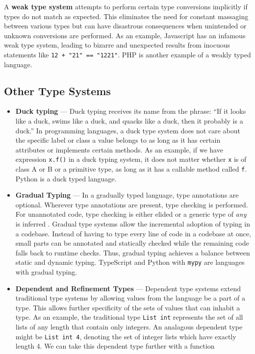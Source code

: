 \documentclass[12pt]{report}
\begin{document}
A \textbf{weak type system} attempts to perform certain type conversions implicitly if types do not match as expected. This eliminates the need for constant massaging between various types but can have disastrous consequences when unintended or unknown conversions are performed. As an example, Javascript has an infamous weak type system, leading to bizarre and unexpected results from inocuous statements like \texttt{12 + "21" == "1221"}. PHP is another example of a weakly typed language.

\subsection{Other Type Systems}
\begin{itemize}

\item \textbf{Duck typing} --- Duck typing receives its name from the phrase: ``If it looks like a duck, swims like a duck, and quacks like a duck, then it probably is a duck.'' In programming languages, a duck type system does not care about the specific label or class a value belongs to as long as it has certain attributes or implements certain methods. As an example, if we have expression \texttt{x.f()} in a duck typing system, it does not matter whether \texttt{x} is of class A or B or a primitive type, as long as it has a callable method called \texttt{f}. Python is a duck typed language.

\item \textbf{Gradual Typing} --- In a gradually typed language, type annotations are optional. Wherever type annotations are present, type checking is performed. For unannotated code, type checking is either elided or a generic type of \textit{any} is inferred \cite{PythonDropbox}. Gradual type systems allow the incremental adoption of typing in a codebase. Instead of having to type every line of code in a codebase at once, small parts can be annotated and statically checked while the remaining code falls back to runtime checks. Thus, gradual typing achieves a balance between static and dynamic typing. TypeScript and Python with \texttt{mypy} are languages with gradual typing.

\item \textbf{Dependent and Refinement Types} --- Dependent type systems extend traditional type systems by allowing values from the language be a part of a type. This allows further specificity of the sets of values that can inhabit a type. As an example, the traditional type \texttt{List int} represents the set of all lists of any length that contain only integers. An analagous dependent type might be \texttt{List int 4}, denoting the set of integer lists which have exactly length 4. We can take this dependent type further with a function


\end{itemize}
\end{document}
